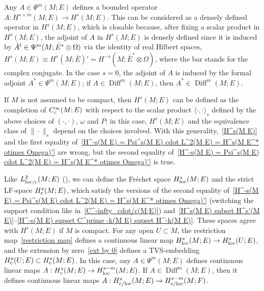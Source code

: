 \documentclass{memo-l}
\theoremstyle{plain}
\theoremstyle{definition}
\theoremstyle{remark}
\newcommand{\Diff}{\operatorname{Diff}}
\newcommand{\co}{{\text{\rm c}}}
\newcommand{\trans}{{\text{\rm t}}}
\newcommand{\Cinftyc}{C^\infty_{\text{\rm c}}}
\numberwithin{section}{chapter}
\numberwithin{equation}{section}%
\begin{document}
Any $A\in\Psi^m(M;E)$ defines a bounded operator $A:H^{s+m}(M;E)\to H^s(M;E)$. This can be considered as a densely defined operator in $H^s(M;E)$, which is closable because, after fixing a scalar product in $H^s(M;E)$, the adjoint of $A$ in $H^s(M;E)$ is densely defined since it is induced by $\bar A^\trans\in\Psi^m(M;\bar E^*\otimes\Omega)$ via the identity of real Hilbert spaces, $H^s(M;E)\equiv H^s(M;\bar E)'=H^{-s}(M;\bar E^*\otimes\Omega)$, where the bar stands for the complex conjugate. In the case $s=0$, the adjoint of $A$ is induced by the formal adjoint $A^*\in\Psi^m(M;E)$; if $A\in\Diff^m(M;E)$, then $A^*\in\Diff^m(M;E)$. 

If $M$ is not assumed to be compact, then $H^s(M;E)$ can be defined as the completion of $\Cinftyc(M;E)$ with respect to the scalar product $\langle{\cdot},{\cdot}\rangle_s$ defined by the above choices of $({\cdot},{\cdot})$, $\omega$ and $P$; in this case, $H^s(M;E)$ and the equivalence class of $\|{\cdot}\|_s$ depend on the choices involved. With this generality,~\eqref{H^s(M E)} and the first equality of~\eqref{H^-s(M E) = Psi^s(M E) cdot L^2(M E) = H^s(M E^* otimes Omega)'} are wrong, but the second equality of~\eqref{H^-s(M E) = Psi^s(M E) cdot L^2(M E) = H^s(M E^* otimes Omega)'} is true. %

Like $L^2_{\text{\rm loc/c}}(M;E)$ (), we can define the Fr\'echet space $H^s_{\text{\rm loc}}(M;E)$ and the strict LF-space $H^s_\co(M;E)$, which satisfy the versions of the second equality of~\eqref{H^-s(M E) = Psi^s(M E) cdot L^2(M E) = H^s(M E^* otimes Omega)'} (switching the support condition like in~\eqref{C^-infty_cdot/c(M;E)}) and~\eqref{H^s(M E) subset H^s'(M E)}--\eqref{H^-s(M E) supset C^prime -k(M E) supset H^-k(M E)}. These spaces agree with $H^s(M;E)$ if $M$ is compact. For any open $U\subset M$, the restriction map~\eqref{restriction map} defines a continuous linear map $H^s_{\text{\rm loc}}(M;E)\to H^s_{\text{\rm loc}}(U;E)$, and the extension by zero~\eqref{ext by 0} defines a TVS-embedding $H^s_\co(U;E)\subset H^s_\co(M;E)$. In this case, any $A\in\Psi^m(M;E)$ defines continuous linear maps $A:H^s_\co(M;E)\to H^{s-m}_{\text{\rm loc}}(M;E)$. If $A\in\Diff^m(M;E)$, then it defines continuous linear maps $A:H^s_{\text{\rm c/loc}}(M;E)\to H^{s-m}_{\text{\rm c/loc}}(M;F)$.
\end{document}
